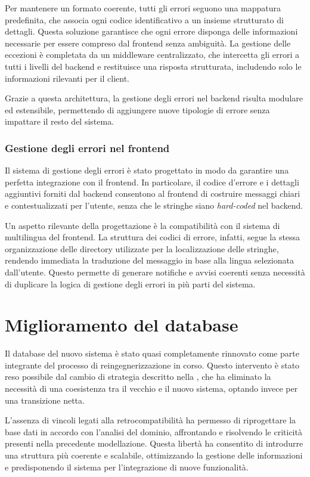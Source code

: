 Per mantenere un formato coerente, tutti gli errori seguono una mappatura predefinita, che associa ogni codice identificativo a un insieme strutturato di dettagli. Questa soluzione garantisce che ogni errore disponga delle informazioni necessarie per essere compreso dal frontend senza ambiguità. La gestione delle eccezioni è completata da un middleware centralizzato, che intercetta gli errori a tutti i livelli del backend e restituisce una risposta strutturata, includendo solo le informazioni rilevanti per il client.

Grazie a questa architettura, la gestione degli errori nel backend risulta modulare ed estensibile, permettendo di aggiungere nuove tipologie di errore senza impattare il resto del sistema.

\subsubsection{Gestione degli errori nel frontend}
Il sistema di gestione degli errori è stato progettato in modo da garantire una perfetta integrazione con il frontend. In particolare, il codice d'errore e i dettagli aggiuntivi forniti dal backend consentono al frontend di costruire messaggi chiari e contestualizzati per l'utente, senza che le stringhe siano \textit{hard-coded} nel backend.

Un aspetto rilevante della progettazione è la compatibilità con il sistema di multilingua del frontend. La struttura dei codici di errore, infatti, segue la stessa organizzazione delle directory utilizzate per la localizzazione delle stringhe, rendendo immediata la traduzione del messaggio in base alla lingua selezionata dall'utente. Questo permette di generare notifiche e avvisi coerenti senza necessità di duplicare la logica di gestione degli errori in più parti del sistema.

\section{Miglioramento del database}
Il database del nuovo sistema è stato quasi completamente rinnovato come parte integrante del processo di reingegnerizzazione in corso. Questo intervento è stato reso possibile dal cambio di strategia descritto nella , che ha eliminato la necessità di una coesistenza tra il vecchio e il nuovo sistema, optando invece per una transizione netta.

L’assenza di vincoli legati alla retrocompatibilità ha permesso di riprogettare la base dati in accordo con l’analisi del dominio, affrontando e risolvendo le criticità presenti nella precedente modellazione. Questa libertà ha consentito di introdurre una struttura più coerente e scalabile, ottimizzando la gestione delle informazioni e predisponendo il sistema per l’integrazione di nuove funzionalità.

